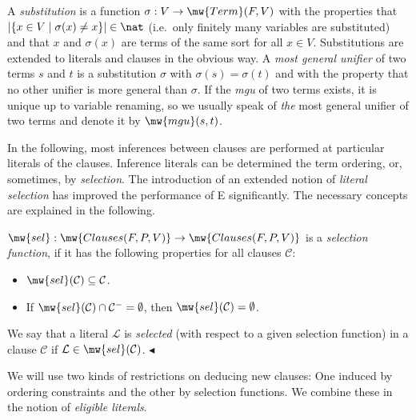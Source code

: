 \documentclass{report}
\begin{document}
A \emph{substitution} is a function
$\sigma: V\to \mw{Term}(F,V)$ with the properties that
$|\{ x\in V \mid \sigma(x)\not=x\}| \in \nat$ (i.e.\ only finitely
many variables are substituted) and that $x$ and $\sigma(x)$ are terms
of the same sort for all $x \in V$. Substitutions are extended to
literals and clauses in the obvious way. A \emph{most general
  unifier} of two terms $s$ and
$t$ is a substitution $\sigma$ with $\sigma(s)=\sigma(t)$ and with the
property that no other unifier is more general than $\sigma$. If the
\emph{mgu} of two terms exists, it is unique up to variable renaming,
so we usually speak of \emph{the} most general unifier of two terms
and denote it by $\mw{mgu}(s,t)$.

In the following, most inferences between clauses are performed at
particular literals of the clauses. Inference literals can be
determined the term ordering, or, sometimes, by \emph{selection}.  The
introduction of an extended notion of \emph{literal selection} has
improved the performance of E significantly. The necessary concepts
are explained in the following.

\begin{definition}
  \label{def:basics:inferences:selection}
  $\mw{sel}:\mw{Clauses(F,P,V)} \rightarrow \mw{Clauses(F,P,V)}$ is a
  \emph{selection function}, if it has the following properties for
  all clauses $\mathcal{C}$:
    \begin{itemize}
    \item $\mw{sel}(\mathcal{C}) \subseteq \mathcal{C}$.
    \item If $\mw{sel}(\mathcal{C})\cap \mathcal{C^-} = \emptyset$, then
      $\mw{sel}(\mathcal{C}) = \emptyset$.
    \end{itemize}
    We say that a literal $\mathcal{L}$ is \emph{selected} (with
    respect to a given selection function) in a clause $\mathcal{C}$
    if $\mathcal{L} \in \mw{sel}(\mathcal{C})$.
  \hfill$\blacktriangleleft$
\end{definition}

We will use two kinds of restrictions on deducing new clauses: One
induced by ordering constraints and the other by selection functions.
We combine these in the notion of \emph{eligible literals}.
\end{document}
